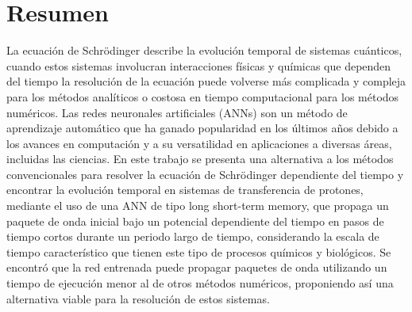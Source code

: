 \begingroup
\let\clearpage\relax
\let\cleardoublepage\relax
\let\cleardoublepage\relax

\chapter*{Resumen}
\small
La ecuación de Schrödinger describe la evolución temporal de sistemas cuánticos, cuando estos sistemas involucran interacciones físicas y químicas que dependen del tiempo la resolución de la ecuación puede volverse más complicada y compleja para los métodos analíticos o costosa en tiempo computacional para los métodos numéricos. Las redes neuronales artificiales (\acs{ANN}s) son un método de aprendizaje automático que ha ganado popularidad en los últimos años debido a los avances en computación y a su versatilidad en aplicaciones a diversas áreas, incluidas las ciencias. En este trabajo se presenta una alternativa a los métodos convencionales para resolver la ecuación de Schrödinger dependiente del tiempo y encontrar la evolución temporal en sistemas de transferencia de protones, mediante el uso de una \acs{ANN} de tipo long short-term memory, que propaga un paquete de onda inicial bajo un potencial dependiente del tiempo en pasos de tiempo cortos durante un periodo largo de tiempo, considerando la escala de tiempo característico que tienen este tipo de procesos químicos y biológicos. Se encontró que la red entrenada puede propagar paquetes de onda utilizando un tiempo de ejecución menor al de otros métodos numéricos, proponiendo así una alternativa viable para la resolución de estos sistemas.


